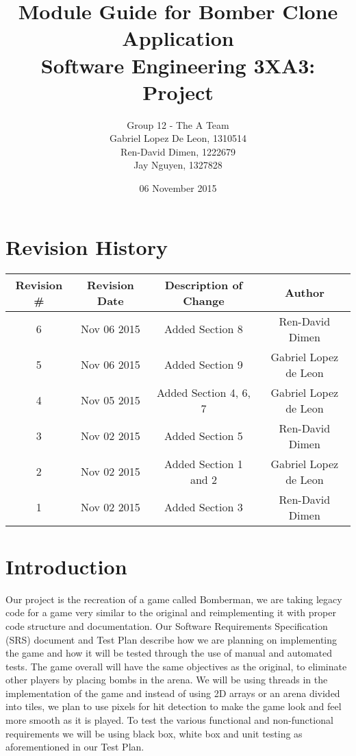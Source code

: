 \documentclass[12pt, letterpaper]{article}
\title{\textbf{Module Guide for Bomber Clone Application \\ \Large Software Engineering 3XA3: Project}}
\author{Group 12 - The A Team \\Gabriel Lopez De Leon, 1310514\\Ren-David Dimen, 1222679\\Jay Nguyen, 1327828}
\date{06 November 2015}
\begin{document}
	
	\begin{titlepage}
		\clearpage\maketitle
		\thispagestyle{empty}
	\end{titlepage}
	
	\newpage
	\tableofcontents
	\newpage
	
	\section{Revision History}
	
	\begin{tabular}{ |c|c|c|c| } 
		\hline
		\textbf{Revision \#} & \textbf{Revision Date} & \textbf{Description of Change} & \textbf{Author}\\
		\hline
		6 & Nov 06 2015 & Added Section 8 & Ren-David Dimen\\
		\hline
		5 & Nov 06 2015 & Added Section 9 & Gabriel Lopez de Leon\\
		\hline
		4 & Nov 05 2015 & Added Section 4, 6, 7 & Gabriel Lopez de Leon\\
		\hline
		3 & Nov 02 2015 & Added Section 5 & Ren-David Dimen\\
		\hline
		2 & Nov 02 2015 & Added Section 1 and 2 & Gabriel Lopez de Leon\\
		\hline
		1 & Nov 02 2015 & Added Section 3 & Ren-David Dimen\\
		\hline
	\end{tabular}
	
	\newpage
		
	\section{Introduction}
	\indent \indent Our project is the recreation of a game called Bomberman, we are taking legacy code for a game very similar to the original and reimplementing it with proper code structure and documentation. Our Software Requirements Specification (SRS) document and Test Plan describe how we are planning on implementing the game and how it will be tested through the use of manual and automated tests. The game overall will have the same objectives as the original, to eliminate other players by placing bombs in the arena. We will be using threads in the implementation of the game and instead of using 2D arrays or an arena divided into tiles, we plan to use pixels for hit detection to make the game look and feel more smooth as it is played. To test the various functional and non-functional requirements we will be using black box, white box and unit testing as aforementioned in our Test Plan. \\
	 
\end{document}
